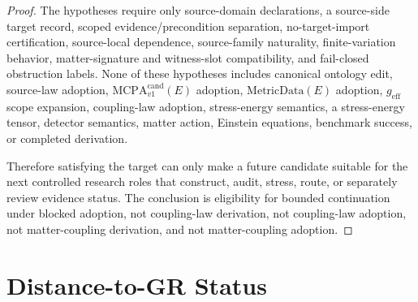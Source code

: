 \documentclass[11pt]{article}
\newcommand{\MetricData}{\mathrm{MetricData}}
\newcommand{\geff}{g_{\mathrm{eff}}}
\newcommand{\MCPA}{\mathrm{MCPA}^{\mathrm{cand}}_{v1}}
\begin{document}
\begin{proof}
The hypotheses require only source-domain declarations, a source-side target
record, scoped evidence/precondition separation, no-target-import
certification, source-local dependence, source-family naturality,
finite-variation behavior, matter-signature and witness-slot compatibility,
and fail-closed obstruction labels. None of these hypotheses includes
canonical ontology edit, source-law adoption, \(\MCPA(E)\) adoption,
\(\MetricData(E)\) adoption, \(\geff\) scope expansion, coupling-law
adoption, stress-energy semantics, a stress-energy tensor, detector
semantics, matter action, Einstein equations, benchmark success, or completed
derivation.

Therefore satisfying the target can only make a future candidate suitable for
the next controlled research roles that construct, audit, stress, route, or
separately review evidence status. The conclusion is eligibility for bounded
continuation under blocked adoption, not coupling-law derivation, not
coupling-law adoption, not matter-coupling derivation, and not
matter-coupling adoption.
\end{proof}

\section{Distance-to-GR Status}
\end{document}
